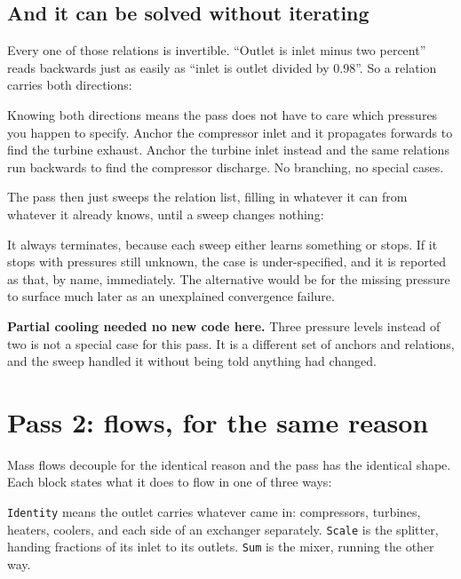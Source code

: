 \documentclass[11pt,a4paper]{report}
\newcommand{\code}[1]{\texttt{\small #1}}
\begin{document}
\subsection{And it can be solved without iterating}

Every one of those relations is invertible. ``Outlet is inlet minus two
percent'' reads backwards just as easily as ``inlet is outlet divided by
\num{0.98}''. So a relation carries both directions:


\noindent Knowing both directions means the pass does not have to care which
pressures you happen to specify. Anchor the compressor inlet and it
propagates forwards to find the turbine exhaust. Anchor the turbine inlet
instead and the same relations run backwards to find the compressor
discharge. No branching, no special cases.

The pass then just sweeps the relation list, filling in whatever it can from
whatever it already knows, until a sweep changes nothing:


\noindent It always terminates, because each sweep either learns something
or stops. If it stops with pressures still unknown, the case is
under-specified, and it is reported as that, by name, immediately. The
alternative would be for the missing pressure to surface much later as an
unexplained convergence failure.

\textbf{Partial cooling needed no new code here.} Three pressure levels
instead of two is not a special case for this pass. It is a different set of
anchors and relations, and the sweep handled it without being told anything
had changed.

\section{Pass 2: flows, for the same reason}

Mass flows decouple for the identical reason and the pass has the identical
shape. Each block states what it does to flow in one of three ways:


\noindent \code{Identity} means the outlet carries whatever came in:
compressors, turbines, heaters, coolers, and each side of an exchanger
separately. \code{Scale} is the splitter, handing fractions of its inlet to
its outlets. \code{Sum} is the mixer, running the other way.
\end{document}
